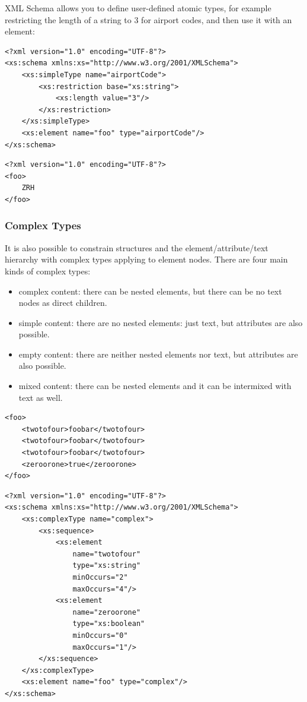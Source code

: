 XML Schema allows you to define user-defined atomic types, for example restricting the length of a string to 3 for airport codes, and then use it with an element:

\begin{lstlisting}[style=XML,caption={XML Schema for Airport Codes}]
<?xml version="1.0" encoding="UTF-8"?>
<xs:schema xmlns:xs="http://www.w3.org/2001/XMLSchema">
    <xs:simpleType name="airportCode">
        <xs:restriction base="xs:string">
            <xs:length value="3"/>
        </xs:restriction>
    </xs:simpleType>
    <xs:element name="foo" type="airportCode"/>
</xs:schema>
\end{lstlisting}

\begin{lstlisting}[style=XML,caption={Valid XML Code with the above Schema for Airport Codes}]
<?xml version="1.0" encoding="UTF-8"?>
<foo>
    ZRH
</foo>
\end{lstlisting}

\subsubsection{Complex Types}
It is also possible to constrain structures and the element/attribute/text hierarchy with complex types applying to element nodes. There are four main kinds of complex types:
\begin{itemize}
    \item complex content: there can be nested elements, but there can be no text nodes as direct children.
    \item simple content: there are no nested elements: just text, but attributes are also possible.
    \item empty content: there are neither nested elements nor text, but attributes are also possible.
    \item mixed content: there can be nested elements and it can be intermixed with text as well.
\end{itemize}

\begin{lstlisting}[style=XML,caption={XML Code Example with complex content.}]
<foo>
    <twotofour>foobar</twotofour>
    <twotofour>foobar</twotofour>
    <twotofour>foobar</twotofour>
    <zeroorone>true</zeroorone>
</foo>
\end{lstlisting}

\begin{lstlisting}[style=XML,caption={XML Schema for the above Example with complex content.}]
<?xml version="1.0" encoding="UTF-8"?>
<xs:schema xmlns:xs="http://www.w3.org/2001/XMLSchema">
    <xs:complexType name="complex">
        <xs:sequence>
            <xs:element
                name="twotofour"
                type="xs:string"
                minOccurs="2"
                maxOccurs="4"/>
            <xs:element
                name="zeroorone"
                type="xs:boolean"
                minOccurs="0"
                maxOccurs="1"/>
        </xs:sequence>
    </xs:complexType>
    <xs:element name="foo" type="complex"/>
</xs:schema>
\end{lstlisting}

